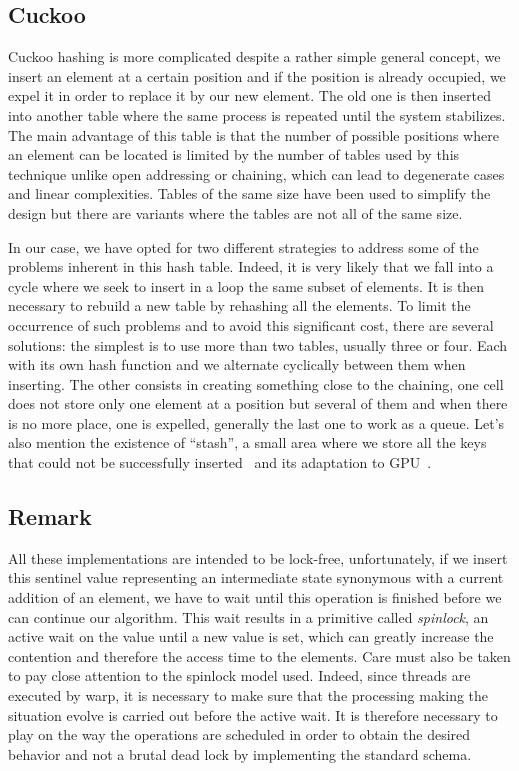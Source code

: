 \subsection{Cuckoo}

Cuckoo hashing is more complicated despite a rather simple general concept, we insert an element at a certain position and if the position is already occupied, we expel it in order to replace it by our new element. The old one is then inserted into another table where the same process is repeated until the system stabilizes. The main advantage of this table is that the number of possible positions where an element can be located is limited by the number of tables used by this technique unlike open addressing or chaining, which can lead to degenerate cases and linear complexities. Tables of the same size have been used to simplify the design but there are variants where the tables are not all of the same size.

In our case, we have opted for two different strategies to address some of the problems inherent in this hash table. Indeed, it is very likely that we fall into a cycle where we seek to insert in a loop the same subset of elements. It is then necessary to rebuild a new table by rehashing all the elements. To limit the occurrence of such problems and to avoid this significant cost, there are several solutions: the simplest is to use more than two tables, usually three or four. Each with its own hash function and we alternate cyclically between them when inserting. The other consists in creating something close to the chaining, one cell does not store only one element at a position but several of them and when there is no more place, one is expelled, generally the last one to work as a queue. Let's also mention the existence of ``stash'', a small area where we store all the keys that could not be successfully inserted~\cite{kirsch2009more} and its adaptation to GPU~\cite{khorasani2015stadium}.

\subsection{Remark}

All these implementations are intended to be lock-free, unfortunately, if we insert this sentinel value representing an intermediate state synonymous with a current addition of an element, we have to wait until this operation is finished before we can continue our algorithm. This wait results in a primitive called \textit{spinlock}, an active wait on the value until a new value is set, which can greatly increase the contention and therefore the access time to the elements. Care must also be taken to pay close attention to the spinlock model used. Indeed, since threads are executed by warp, it is necessary to make sure that the processing making the situation evolve is carried out before the active wait. It is therefore necessary to play on the way the operations are scheduled in order to obtain the desired behavior and not a brutal dead lock by implementing the standard schema.
